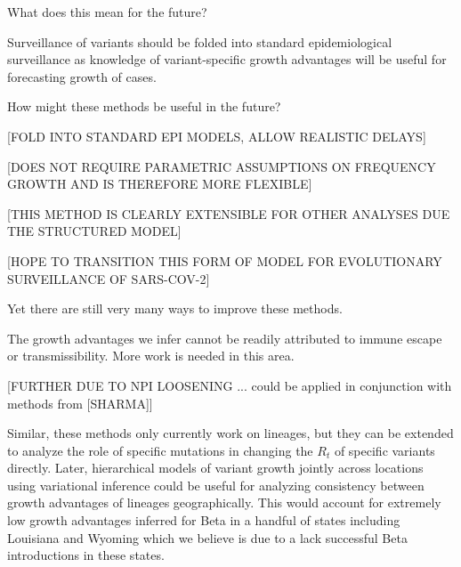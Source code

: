\documentclass[12pt]{article}
\begin{document}

What does this mean for the future?

Surveillance of variants should be folded into standard epidemiological surveillance as knowledge of variant-specific growth advantages will be useful for forecasting growth of cases.

How might these methods be useful in the future?

[FOLD INTO STANDARD EPI MODELS, ALLOW REALISTIC DELAYS]

[DOES NOT REQUIRE PARAMETRIC ASSUMPTIONS ON FREQUENCY GROWTH AND IS THEREFORE MORE FLEXIBLE]

[THIS METHOD IS CLEARLY EXTENSIBLE FOR OTHER ANALYSES DUE THE STRUCTURED MODEL]


[HOPE TO TRANSITION THIS FORM OF MODEL FOR EVOLUTIONARY SURVEILLANCE OF SARS-COV-2]

Yet there are still very many ways to improve these methods.

The growth advantages we infer cannot be readily attributed to immune escape or transmissibility. More work is needed in this area. 

[FURTHER DUE TO NPI LOOSENING ... could be applied in conjunction with methods from [SHARMA]]

Similar, these methods only currently work on lineages, but they can be extended to analyze the role of specific mutations in changing the $R_{t}$ of specific variants directly.
Later, hierarchical models of variant growth jointly across locations using variational inference could be useful for analyzing consistency between growth advantages of lineages geographically.
This would account for extremely low growth advantages inferred for Beta in a handful of states including Louisiana and Wyoming which we believe is due to a lack successful Beta introductions in these states.
\end{document}
